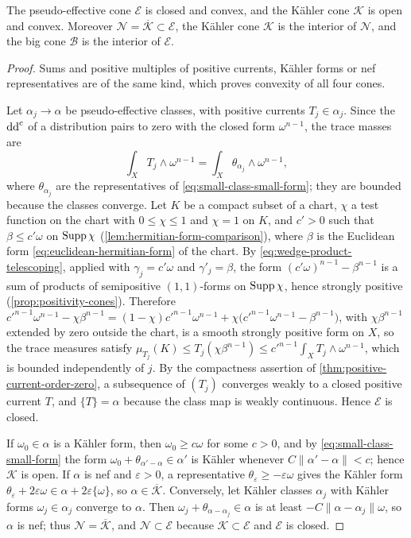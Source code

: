 \begin{proposition}\label{prop:cohomology-cone-topology}
The pseudo-effective cone $\mathcal E$ is closed and convex, and the K\"ahler cone $\mathcal K$ is open and convex. Moreover $\mathcal N=\overline{\mathcal K}\subset\mathcal E$, the K\"ahler cone $\mathcal K$ is the interior of $\mathcal N$, and the big cone $\mathcal B$ is the interior of $\mathcal E$.
\end{proposition}
\begin{proof}
Sums and positive multiples of positive currents, K\"ahler forms or nef representatives are of the same kind, which proves convexity of all four cones.

Let $\alpha_j\to\alpha$ be pseudo-effective classes, with positive currents $T_j\in\alpha_j$. Since the $\mathrm{dd}^{\mathrm{c}}$ of a distribution pairs to zero with the closed form $\omega^{n-1}$, the trace masses are
\[
 \int_XT_j\wedge\omega^{n-1}
       =\int_X\theta_{\alpha_j}\wedge\omega^{n-1},
\]
where $\theta_{\alpha_j}$ are the representatives of \eqref{eq:small-class-small-form}; they are bounded because the classes converge. Let $K$ be a compact subset of a chart, $\chi$ a test function on the chart with $0\leq\chi\leq1$ and $\chi=1$ on $K$, and $c'>0$ such that $\beta\leq c'\omega$ on $\operatorname{Supp}\chi$ (\cref{lem:hermitian-form-comparison}), where $\beta$ is the Euclidean form \eqref{eq:euclidean-hermitian-form} of the chart. By \eqref{eq:wedge-product-telescoping}, applied with $\gamma_j=c'\omega$ and $\gamma'_j=\beta$, the form $(c'\omega)^{n-1}-\beta^{n-1}$ is a sum of products of semipositive $(1,1)$-forms on $\operatorname{Supp}\chi$, hence strongly positive (\cref{prop:positivity-cones}). Therefore $c'^{n-1}\omega^{n-1}-\chi\beta^{n-1}=(1-\chi)c'^{n-1}\omega^{n-1}+\chi\bigl(c'^{n-1}\omega^{n-1}-\beta^{n-1}\bigr)$, with $\chi\beta^{n-1}$ extended by zero outside the chart, is a smooth strongly positive form on $X$, so the trace measures satisfy $\mu_{T_j}(K)\leq T_j(\chi\beta^{n-1})\leq c'^{n-1}\int_XT_j\wedge\omega^{n-1}$, which is bounded independently of $j$. By the compactness assertion of \cref{thm:positive-current-order-zero}, a subsequence of $(T_j)$ converges weakly to a closed positive current $T$, and $\{T\}=\alpha$ because the class map is weakly continuous. Hence $\mathcal E$ is closed.

If $\omega_0\in\alpha$ is a K\"ahler form, then $\omega_0\geq c\omega$ for some $c>0$, and by \eqref{eq:small-class-small-form} the form $\omega_0+\theta_{\alpha'-\alpha}\in\alpha'$ is K\"ahler whenever $C\|\alpha'-\alpha\|<c$; hence $\mathcal K$ is open. If $\alpha$ is nef and $\varepsilon>0$, a representative $\theta_\varepsilon\geq-\varepsilon\omega$ gives the K\"ahler form $\theta_\varepsilon+2\varepsilon\omega\in\alpha+2\varepsilon\{\omega\}$, so $\alpha\in\overline{\mathcal K}$. Conversely, let K\"ahler classes $\alpha_j$ with K\"ahler forms $\omega_j\in\alpha_j$ converge to $\alpha$. Then $\omega_j+\theta_{\alpha-\alpha_j}\in\alpha$ is at least $-C\|\alpha-\alpha_j\|\omega$, so $\alpha$ is nef; thus $\mathcal N=\overline{\mathcal K}$, and $\mathcal N\subset\mathcal E$ because $\mathcal K\subset\mathcal E$ and $\mathcal E$ is closed.


\end{proof}
